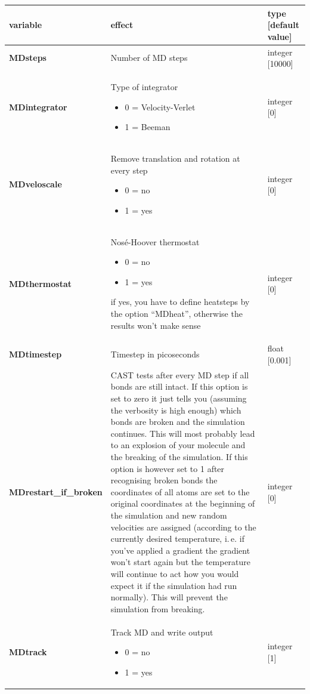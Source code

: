 \documentclass[10pt,a4paper]{article} %
\begin{document}
	\begin{longtable}{|p{3.5cm}|p{5cm}|p{3cm}|}
		variable & effect & type [default value] \\
		\hline
		\textbf{MDsteps} & Number of MD steps & integer [10000] \\
		\textbf{MDintegrator} & Type of integrator \begin{itemize}
			\item 0  = Velocity-Verlet \item 1 = Beeman
			\end{itemize} 	
		& integer [0] \\
		\textbf{MDveloscale} & Remove translation and rotation at every step\begin{itemize} \item 0 = no \item 1 = yes\end{itemize}& integer [0] \\
		\textbf{MDthermostat} & Nosé-Hoover thermostat\begin{itemize} \item 0 = no \item 1 = yes\end{itemize} if yes, you have to define heatsteps by the option ``MDheat'', otherwise the results won't make sense
		 & integer [0] \\
		\textbf{MDtimestep} & Timestep in picoseconds & float [0.001] \\
		\textbf{MDrestart\_if\_broken} & CAST tests after every MD step if all bonds are still intact. If this option is set to zero it just tells you (assuming the verbosity is high enough) which bonds are broken and the simulation continues. This will most probably lead to an explosion of your molecule and the breaking of the simulation. If this option is however set to 1 after recognising broken bonds the coordinates of all atoms are set to the original coordinates at the beginning of the simulation and new random velocities are assigned (according to the currently desired temperature, i.\,e. if you've applied a gradient the gradient won't start again but the temperature will continue to act how you would expect it if the simulation had run normally). This will prevent the simulation from breaking. & integer [0] \\
		\textbf{MDtrack} & Track MD and write output\begin{itemize} \item 0 = no \item 1 = yes\end{itemize}& integer [1] \\

\end{longtable}
\end{document}
